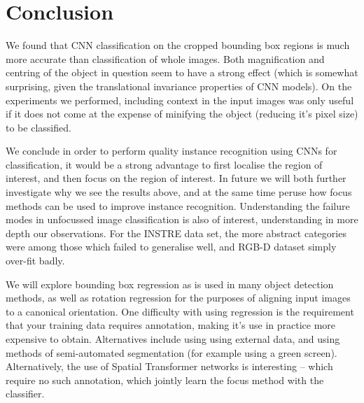 \documentclass[conference]{IEEEtran}
\begin{document}
\section{Conclusion}

We found that CNN classification on the cropped bounding box regions is much more accurate than classification of whole images. Both magnification and centring of the object in question seem to have a strong effect (which is somewhat surprising, given the translational invariance properties of CNN models). On the experiments we performed, including context in the input images was only useful if it does not come at the expense of minifying the object (reducing it's pixel size) to be classified.

We conclude in order to perform quality instance recognition using CNNs for classification, it would be a strong advantage to first localise the region of interest, and then focus on the region of interest.  In future we will both further investigate why we see the results above, and at the same time peruse how focus methods can be used to improve instance recognition. Understanding the failure modes in unfocussed image classification is also of interest, understanding in more depth our observations. For the INSTRE data set, the more abstract categories were among those which failed to generalise well, and RGB-D dataset simply over-fit badly.

We will explore bounding box regression as is used in many object detection methods, as well as rotation regression for the purposes of aligning input images to a canonical orientation. One difficulty with using regression is the requirement that your training data requires annotation, making it's use in practice more expensive to obtain. Alternatives include using using external data, and using methods of semi-automated segmentation (for example using a green screen). Alternatively, the use of Spatial Transformer networks is interesting -- which require no such annotation, which jointly learn the focus method with the classifier.




  
  




\end{document}
